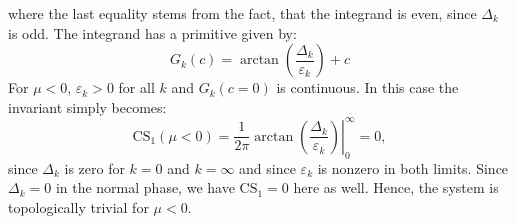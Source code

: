where the last equality stems from the fact, that the integrand is even, since $\Delta_k$ is odd. The integrand has a primitive given by:
\begin{equation}
G_k(c) = \arctan\left(\frac{\Delta_k}{\varepsilon_k}\right) + c \nonumber
\end{equation}
For $\mu < 0$, $\varepsilon_k > 0$ for all $k$ and $G_k(c = 0)$ is continuous. In this case the invariant simply becomes:
\begin{equation}
\text{CS}_1(\mu < 0) = \left. \frac{1}{2\pi}\arctan\left(\frac{\Delta_k}{\varepsilon_k}\right)\right|_{0}^{\infty} = 0,
\end{equation}
since $\Delta_k$ is zero for $k = 0$ and $k = \infty$ and since $\varepsilon_k$ is nonzero in both limits. Since $\Delta_k = 0$ in the normal phase, we have $\text{CS}_1 = 0$ here as well. Hence, the system is topologically trivial for $\mu < 0$. 

